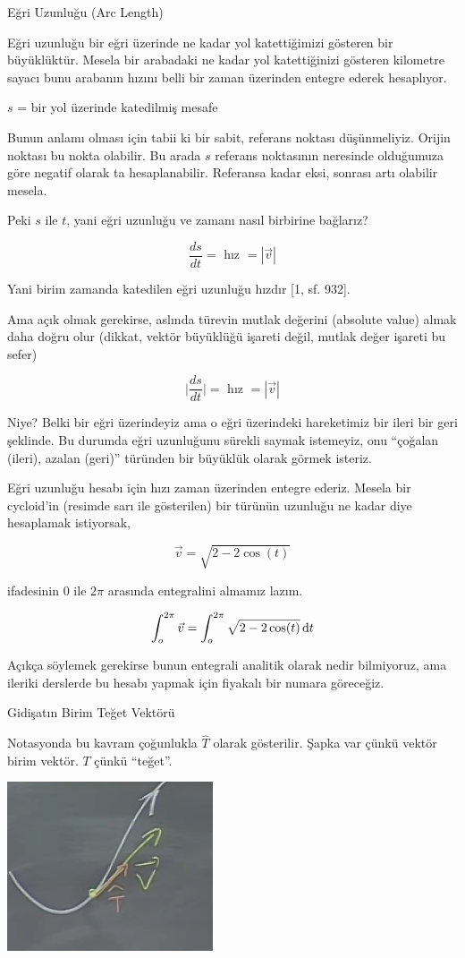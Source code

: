 \documentclass[12pt,fleqn]{article}\usepackage{../../common}
\begin{document}
Eğri Uzunluğu (Arc Length)

Eğri uzunluğu bir eğri üzerinde ne kadar yol katettiğimizi gösteren bir
büyüklüktür. Mesela bir arabadaki ne kadar yol katettiğinizi gösteren
kilometre sayacı bunu arabanın hızını belli bir zaman üzerinden entegre
ederek hesaplıyor.

$s$ = bir yol üzerinde katedilmiş mesafe

Bunun anlamı olması için tabii ki bir sabit, referans noktası
düşünmeliyiz. Orijin noktası bu nokta olabilir. Bu arada $s$ referans
noktasının neresinde olduğumuza göre negatif olarak ta
hesaplanabilir. Referansa kadar eksi, sonrası artı olabilir mesela.

Peki $s$ ile $t$, yani eğri uzunluğu ve zamanı nasıl birbirine bağlarız? 

$$ \frac{ds}{dt} = \textrm{ hız } = |\vec{v}| $$

Yani birim zamanda katedilen eğri uzunluğu hızdır [1, sf. 932].

Ama açık olmak gerekirse, aslında türevin mutlak değerini (absolute value) almak
daha doğru olur (dikkat, vektör büyüklüğü işareti değil, mutlak değer işareti bu
sefer)

$$ \bigg| \frac{ds}{dt} \bigg| = \textrm{ hız } = |\vec{v}| $$

Niye? Belki bir eğri üzerindeyiz ama o eğri üzerindeki hareketimiz bir ileri bir
geri şeklinde. Bu durumda eğri uzunluğunu sürekli saymak istemeyiz, onu
``çoğalan (ileri), azalan (geri)'' türünden bir büyüklük olarak görmek isteriz.

Eğri uzunluğu hesabı için hızı zaman üzerinden entegre ederiz. Mesela bir
cycloid'in (resimde sarı ile gösterilen) bir türünün uzunluğu ne kadar diye
hesaplamak istiyorsak, 

$$ \vec{v} = \sqrt{ 2-2\cos(t) } $$

ifadesinin 0 ile $2\pi$ arasında entegralini almamız lazım. 

$$ \int_o^{2\pi} \vec{v} = \int_o^{2\pi} \sqrt{ 2-2\cos(t) } \,\mathrm{d} t $$

Açıkça söylemek gerekirse bunun entegrali analitik olarak nedir bilmiyoruz,
ama ileriki derslerde bu hesabı yapmak için fiyakalı bir numara göreceğiz. 

Gidişatın Birim Teğet Vektörü

Notasyonda bu kavram çoğunlukla $\hat{T}$ olarak gösterilir. Şapka var
çünkü vektör birim vektör. $T$ çünkü ``teğet''. 

\begin{center}
\includegraphics[height=5cm]{6_3.png}
\end{center}
\end{document}
